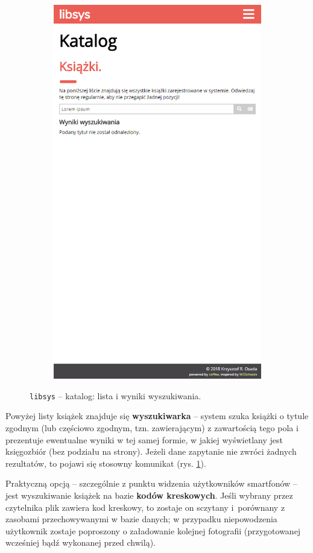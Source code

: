 \documentclass[12pt, a4paper]{article}
\begin{document}
\begin{figure}[h]
\begin{subfigure}{.48\textwidth}
    \includegraphics[width=.75\linewidth]{img/libsys_catalog_2.png}
\end{subfigure}
    \caption{\texttt{libsys} -- katalog: lista i wyniki wyszukiwania.}
    \label{fig:libsys_search_results}
\end{figure}

Powyżej listy książek znajduje się \textbf{wyszukiwarka} -- system szuka książki o tytule zgodnym (lub częściowo zgodnym, tzn. zawierającym) z zawartością tego pola i prezentuje ewentualne wyniki w tej samej formie, w jakiej wyświetlany jest księgozbiór (bez podziału na strony). Jeżeli dane zapytanie nie zwróci żadnych rezultatów, to pojawi się stosowny komunikat (rys. \ref{fig:libsys_search_results}).

Praktyczną opcją -- szczególnie z punktu widzenia użytkowników smartfonów -- jest wyszukiwanie książek na bazie \textbf{kodów kreskowych}. Jeśli wybrany przez czytelnika plik zawiera kod kreskowy, to zostaje on sczytany i~porównany z zasobami przechowywanymi w bazie danych; w przypadku niepowodzenia użytkownik zostaje poproszony o załadowanie kolejnej fotografii (przygotowanej wcześniej bądź wykonanej przed chwilą).
\end{document}
